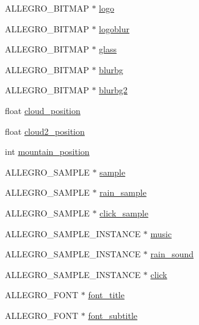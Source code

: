 \begin{DoxyCompactItemize}
\item 
A\-L\-L\-E\-G\-R\-O\-\_\-\-B\-I\-T\-M\-A\-P $\ast$ \hyperlink{structMenu_a57c99e96f0ea7d38a359748533cc0124}{logo}
\item 
A\-L\-L\-E\-G\-R\-O\-\_\-\-B\-I\-T\-M\-A\-P $\ast$ \hyperlink{structMenu_a5f788b05a06fb2322c790e178c34bad6}{logoblur}
\item 
A\-L\-L\-E\-G\-R\-O\-\_\-\-B\-I\-T\-M\-A\-P $\ast$ \hyperlink{structMenu_ad9d4472398e580ffb12c7d7773e8cab8}{glass}
\item 
A\-L\-L\-E\-G\-R\-O\-\_\-\-B\-I\-T\-M\-A\-P $\ast$ \hyperlink{structMenu_ac5a4b29925ad8348687309b38ad37081}{blurbg}
\item 
A\-L\-L\-E\-G\-R\-O\-\_\-\-B\-I\-T\-M\-A\-P $\ast$ \hyperlink{structMenu_acf060e754cd17ee89d5164043058dbb7}{blurbg2}
\item 
float \hyperlink{structMenu_a0e6c60743147ff2ead1e0bb2f89d0036}{cloud\-\_\-position}
\item 
float \hyperlink{structMenu_a143c3675204c7cf1381decbfe4be5476}{cloud2\-\_\-position}
\item 
int \hyperlink{structMenu_a10770a9453a92c77d64c7fdb0e34e725}{mountain\-\_\-position}
\item 
A\-L\-L\-E\-G\-R\-O\-\_\-\-S\-A\-M\-P\-L\-E $\ast$ \hyperlink{structMenu_a19a25811d2d08b8fa1d1819088168b72}{sample}
\item 
A\-L\-L\-E\-G\-R\-O\-\_\-\-S\-A\-M\-P\-L\-E $\ast$ \hyperlink{structMenu_ad14705d9172d76dc241de8f4657254cc}{rain\-\_\-sample}
\item 
A\-L\-L\-E\-G\-R\-O\-\_\-\-S\-A\-M\-P\-L\-E $\ast$ \hyperlink{structMenu_a012f284df5f9d8e39785a264c736c506}{click\-\_\-sample}
\item 
A\-L\-L\-E\-G\-R\-O\-\_\-\-S\-A\-M\-P\-L\-E\-\_\-\-I\-N\-S\-T\-A\-N\-C\-E $\ast$ \hyperlink{structMenu_a7b8c42bd64118eb18dceafbd9ac8b3d5}{music}
\item 
A\-L\-L\-E\-G\-R\-O\-\_\-\-S\-A\-M\-P\-L\-E\-\_\-\-I\-N\-S\-T\-A\-N\-C\-E $\ast$ \hyperlink{structMenu_a31b58f4005206ba8ecc4b6f40223295f}{rain\-\_\-sound}
\item 
A\-L\-L\-E\-G\-R\-O\-\_\-\-S\-A\-M\-P\-L\-E\-\_\-\-I\-N\-S\-T\-A\-N\-C\-E $\ast$ \hyperlink{structMenu_a8f8e8b511a64f03e71259dde1a7bf6f2}{click}
\item 
A\-L\-L\-E\-G\-R\-O\-\_\-\-F\-O\-N\-T $\ast$ \hyperlink{structMenu_aac0297cac51099ec75020a510a6dcbb3}{font\-\_\-title}
\item 
A\-L\-L\-E\-G\-R\-O\-\_\-\-F\-O\-N\-T $\ast$ \hyperlink{structMenu_a18d7377e798bac336e55e253243d4e13}{font\-\_\-subtitle}

\end{DoxyCompactItemize}
